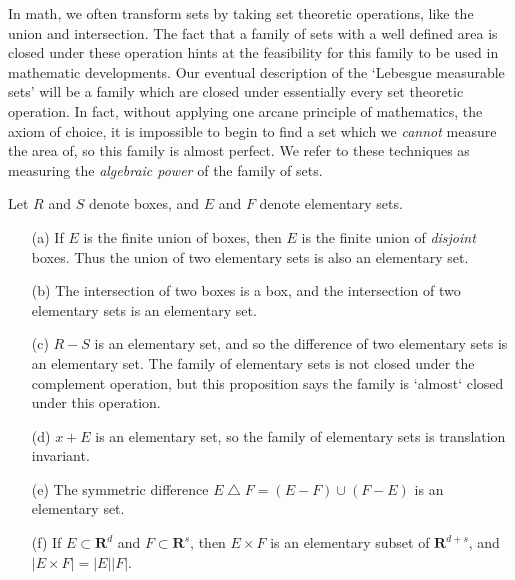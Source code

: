In math, we often transform sets by taking set theoretic operations, like the union and intersection. The fact that a family of sets with a well defined area is closed under these operation hints at the feasibility for this family to be used in mathematic developments. Our eventual description of the `Lebesgue measurable sets' will be a family which are closed under essentially every set theoretic operation. In fact, without applying one arcane principle of mathematics, the axiom of choice, it is impossible to begin to find a set which we {\it cannot} measure the area of, so this family is almost perfect. We refer to these techniques as measuring the {\it algebraic power} of the family of sets.

\begin{theorem}
  Let $R$ and $S$ denote boxes, and $E$ and $F$ denote elementary sets.
  \begin{enumerate}
      \item[(a)] If $E$ is the finite union of boxes, then $E$ is the finite union of {\it disjoint} boxes. Thus the union of two elementary sets is also an elementary set.
      \item[(b)] The intersection of two boxes is a box, and the intersection of two elementary sets is an elementary set.
      \item[(c)] $R-S$ is an elementary set, and so the difference of two elementary sets is an elementary set. The family of elementary sets is not closed under the complement operation, but this proposition says the family is `almost` closed under this operation.
      \item[(d)] $x + E$ is an elementary set, so the family of elementary sets is translation invariant.
      \item[(e)] The symmetric difference $E \bigtriangleup F = (E - F) \cup (F - E)$ is an elementary set.
      \item[(f)] If $E \subset \mathbf{R}^d$ and $F \subset \mathbf{R}^s$, then $E \times F$ is an elementary subset of $\mathbf{R}^{d+s}$, and $|E \times F| = |E||F|$.
  \end{enumerate}
\end{theorem}
